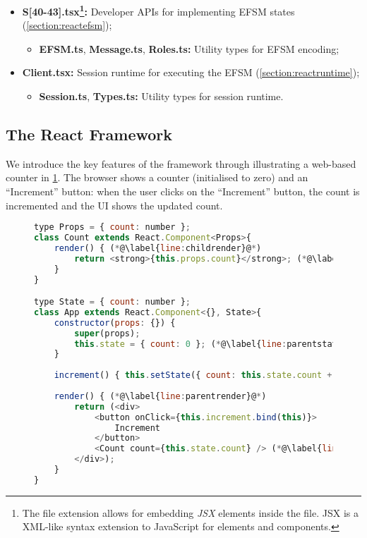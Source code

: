 \begin{itemize}

\item 
\textbf{S[40-43].tsx\footnote{
The  file extension allows
for embedding \textit{JSX} \cite{JSX} elements inside the file.
JSX is a XML-like syntax extension to JavaScript
for elements and components.
}:}
Developer APIs for implementing EFSM states 
(\cref{section:reactefsm});

\begin{itemize}
\item
\textbf{EFSM.ts}, \textbf{Message.ts}, \textbf{Roles.ts:}
Utility types for EFSM encoding;
\end{itemize}

\item 
\textbf{Client.tsx:} 
Session runtime for executing the EFSM 
(\cref{section:reactruntime});

\begin{itemize}
\item
\textbf{Session.ts}, \textbf{Types.ts:}
Utility types for session runtime.
\end{itemize}

\end{itemize}

\subsection{The React Framework}
\label{subsection:react}

We introduce the key features of the framework
through illustrating a web-based counter in \cref{lst:counter}.
The browser shows a counter (initialised to zero) 
and an ``Increment'' button:
when the user clicks on the ``Increment'' button,
the count is incremented and the UI shows the updated count.

\begin{figure}[!h]
\begin{lstlisting}[language=javascript,tabsize=2]
type Props = { count: number };
class Count extends React.Component<Props>{
	render() { (*@\label{line:childrender}@*)
		return <strong>{this.props.count}</strong>; (*@\label{line:childprops}@*)
	}
}

type State = { count: number };
class App extends React.Component<{}, State>{
	constructor(props: {}) {
		super(props);
		this.state = { count: 0 }; (*@\label{line:parentstate}@*)
	}
	
	increment() { this.setState({ count: this.state.count + 1 }); (*@\label{line:parentsetstate}@*)
	
	render() { (*@\label{line:parentrender}@*)
		return (<div>
			<button onClick={this.increment.bind(this)}>
				Increment
			</button>
			<Count count={this.state.count} /> (*@\label{line:childcomponent}@*)
		</div>);	
	}
}
\end{lstlisting}
\label{lst:counter}
\end{figure}

